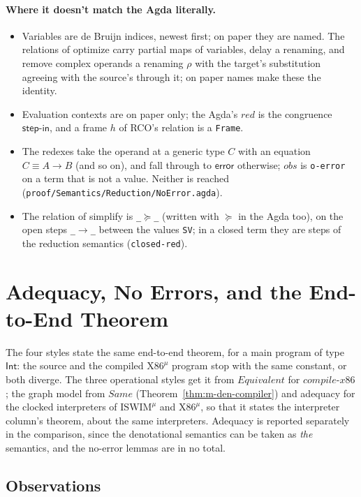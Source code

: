 \documentclass[10pt]{article}
\theoremstyle{acmplain}
\newcommand{\key}[1]{\mathsf{#1}}
\newcommand{\pass}[1]{\mathit{#1}}
\newcommand{\error}{\key{error}}
\newcommand{\obs}{\mathit{obs}}
\newcommand{\Equiv}{\mathit{Equivalent}}
\newcommand{\Same}{\mathit{Same}}
\newcommand{\Ml}[1]{\textrm{#1}^{\mu}}                  %
\begin{document}
\paragraph{Where it doesn't match the Agda literally.}
\begin{itemize}
\item Variables are de Bruijn indices, newest first; on paper they are
  named. The relations of optimize carry partial maps of variables, delay
  a renaming, and remove complex operands a renaming $\rho$ with the
  target's substitution agreeing with the source's through it; on paper
  names make these the identity.
\item Evaluation contexts are on paper only; the Agda's $\mathit{red}$ is the
  congruence $\key{step\text{-}in}$, and a frame $h$ of RCO's relation is a
  \texttt{Frame}.
\item The redexes take the operand at a generic type $C$ with an equation
  $C \equiv A \rightarrow B$ (and so on), and fall through to $\error$
  otherwise; $\obs$ is \texttt{o-error} on a term that is not a value.
  Neither is reached (\texttt{proof/Semantics/Reduction/NoError.agda}).
\item The relation of simplify is \texttt{\_$\succcurlyeq$\_} (written with
  $\succcurlyeq$ in the Agda too), on the open steps \texttt{\_$\longrightarrow$\_}
  between the values \texttt{SV}; in a closed term they are steps of the
  reduction semantics (\texttt{closed-red}).
\end{itemize}
\section{Adequacy, No Errors, and the End-to-End Theorem}\label{sec:m-thm}

The four styles state the same end-to-end theorem, for a main program of
type $\key{Int}$: the source and the compiled $\Ml{X86}$ program stop with the
same constant, or both diverge. The three operational styles get it from
$\Equiv$ for $\pass{compile\text{-}x86}$; the graph model from
$\Same$ (Theorem~\ref{thm:m-den-compiler}) and adequacy for the clocked
interpreters of $\Ml{ISWIM}$ and $\Ml{X86}$, so that it states the
interpreter column's theorem, about the same interpreters. Adequacy is
reported separately in the comparison, since the denotational semantics
can be taken as \emph{the} semantics, and the no-error lemmas are in no
total.

\subsection{Observations}
\end{document}
